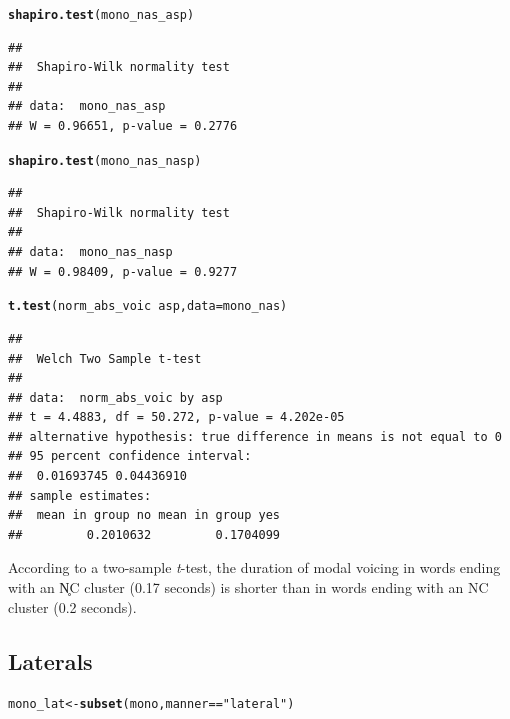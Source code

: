 \documentclass[a4paper,11pt]{article}\usepackage[]{graphicx}\usepackage[]{color}
\makeatletter
\newcommand{\hlstr}[1]{\textcolor[rgb]{0.192,0.494,0.8}{#1}}%
\newcommand{\hlopt}[1]{\textcolor[rgb]{0,0,0}{#1}}%
\newcommand{\hlstd}[1]{\textcolor[rgb]{0.345,0.345,0.345}{#1}}%
\newcommand{\hlkwb}[1]{\textcolor[rgb]{0.69,0.353,0.396}{#1}}%
\newcommand{\hlkwc}[1]{\textcolor[rgb]{0.333,0.667,0.333}{#1}}%
\newcommand{\hlkwd}[1]{\textcolor[rgb]{0.737,0.353,0.396}{\textbf{#1}}}%
\newenvironment{kframe}{%
 \def\at@end@of@kframe{}%
 \ifinner\ifhmode%
  \def\at@end@of@kframe{\end{minipage}}%
  \begin{minipage}{\columnwidth}%
 \fi\fi%
 \def\FrameCommand##1{\hskip\@totalleftmargin \hskip-\fboxsep
 \colorbox{shadecolor}{##1}\hskip-\fboxsep
     \hskip-\linewidth \hskip-\@totalleftmargin \hskip\columnwidth}%
 \MakeFramed {\advance\hsize-\width
   \@totalleftmargin\z@ \linewidth\hsize
   \@setminipage}}%
 {\par\unskip\endMakeFramed%
 \at@end@of@kframe}
\newenvironment{knitrout}{}{} %
\makeatother
\begin{document}
\begin{knitrout}
\color{fgcolor}\begin{kframe}
\begin{alltt}
\hlkwd{shapiro.test}\hlstd{(mono_nas_asp)}
\end{alltt}
\begin{verbatim}
## 
## 	Shapiro-Wilk normality test
## 
## data:  mono_nas_asp
## W = 0.96651, p-value = 0.2776
\end{verbatim}
\begin{alltt}
\hlkwd{shapiro.test}\hlstd{(mono_nas_nasp)}
\end{alltt}
\begin{verbatim}
## 
## 	Shapiro-Wilk normality test
## 
## data:  mono_nas_nasp
## W = 0.98409, p-value = 0.9277
\end{verbatim}
\begin{alltt}
\hlkwd{t.test}\hlstd{(norm_abs_voic} \hlopt{~} \hlstd{asp,} \hlkwc{data} \hlstd{= mono_nas)}
\end{alltt}
\begin{verbatim}
## 
## 	Welch Two Sample t-test
## 
## data:  norm_abs_voic by asp
## t = 4.4883, df = 50.272, p-value = 4.202e-05
## alternative hypothesis: true difference in means is not equal to 0
## 95 percent confidence interval:
##  0.01693745 0.04436910
## sample estimates:
##  mean in group no mean in group yes 
##         0.2010632         0.1704099
\end{verbatim}
\end{kframe}
\end{knitrout}

According to a two-sample \textit{t}-test, the duration of modal voicing in words ending with an N̥C cluster (0.17 seconds) is shorter than in words ending with an NC cluster (0.2 seconds).

\subsection{Laterals}

\begin{knitrout}
\color{fgcolor}\begin{kframe}
\begin{alltt}
\hlstd{mono_lat} \hlkwb{<-} \hlkwd{subset}\hlstd{(mono, manner} \hlopt{==} \hlstr{"lateral"}\hlstd{)}
\end{alltt}
\end{kframe}
\end{knitrout}
\end{document}
